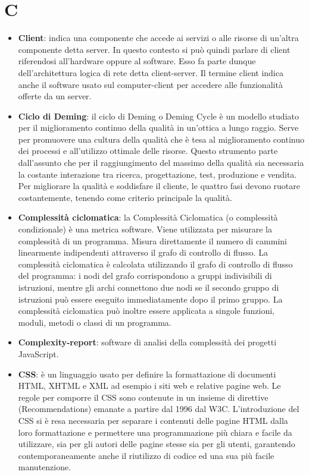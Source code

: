 \section{C}
\begin{itemize}
	\item
	\textbf{Client}: indica una componente che accede ai servizi o alle risorse di un'altra componente detta server. In questo contesto si può quindi parlare di client riferendosi all'hardware oppure al software. Esso fa parte dunque dell'architettura logica di rete detta client-server.
Il termine client indica anche il software usato sul computer-client per accedere alle funzionalità offerte da un server.
	\item
	\textbf{Ciclo di Deming}: il ciclo di Deming o Deming Cycle è un modello studiato per il miglioramento continuo della qualità in un'ottica a lungo raggio. Serve per promuovere una cultura della qualità che è tesa al miglioramento continuo dei processi e all'utilizzo ottimale delle risorse. Questo strumento parte dall'assunto che per il raggiungimento del massimo della qualità sia necessaria la costante interazione tra ricerca, progettazione, test, produzione e vendita. Per migliorare la qualità e soddisfare il cliente, le quattro fasi devono ruotare costantemente, tenendo come criterio principale la qualità.
	\item
	\textbf{Complessità ciclomatica}: la Complessità Ciclomatica (o complessità condizionale) è una metrica software. Viene utilizzata per misurare la complessità di un programma. Misura direttamente il numero di cammini linearmente indipendenti attraverso il grafo di controllo di flusso. La complessità ciclomatica è calcolata utilizzando il grafo di controllo di flusso del programma: i nodi del grafo corrispondono a gruppi indivisibili di istruzioni, mentre gli archi connettono due nodi se il secondo gruppo di istruzioni può essere eseguito immediatamente dopo il primo gruppo. La complessità ciclomatica può inoltre essere applicata a singole funzioni, moduli, metodi o classi di un programma.
	\item
	\textbf{Complexity-report}: software di analisi della complessità dei progetti JavaScript. 
	\item
	\textbf{CSS}: è un linguaggio usato per definire la formattazione di documenti HTML, XHTML e XML ad esempio i siti web e relative pagine web. Le regole per comporre il CSS sono contenute in un insieme di direttive (Recommendations) emanate a partire dal 1996 dal W3C.
	L'introduzione del CSS si è resa necessaria per separare i contenuti delle pagine HTML dalla loro formattazione e permettere una programmazione più chiara e facile da utilizzare, sia per gli autori delle pagine stesse sia per gli utenti, garantendo contemporaneamente anche il riutilizzo di codice ed una sua più facile manutenzione. 

\end{itemize}
